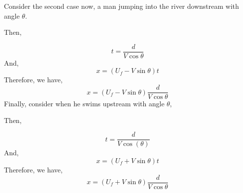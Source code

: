Consider the second case now, a man jumping into the river downstream with angle \(\theta\).

\begin{figure}[H]
    \centering
\end{figure}

Then,

\[
    t = \frac{d}{V\cos\theta}
\]
And, 
\[
    x = (U_f - V\sin\theta)t 
\]
Therefore, we have,
\begin{equation}
    x = (U_f - V\sin\theta) \frac{d}{V\cos\theta}
\end{equation}
Finally, consider when he swims upstream with angle \(\theta\), 

\begin{figure}[H]
    \centering
\end{figure}

Then,

\[
    t = \frac{d}{V\cos(\theta)}
\]
And, 
\[
    x = (U_f + V\sin\theta)t 
\]
Therefore, we have,
\begin{equation}
    x = (U_f + V\sin\theta) \frac{d}{V\cos\theta}
\end{equation}




